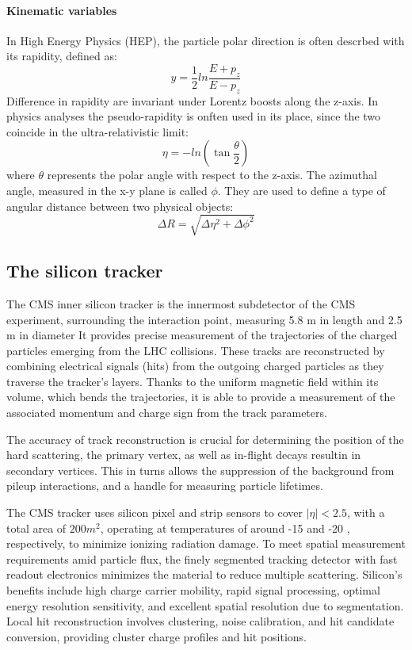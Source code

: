 \paragraph{Kinematic variables\\}
In High Energy Physics (HEP), the particle polar direction is often descrbed with its rapidity, defined as:
\begin{equation}
  \label{eq:rapidityDefinition}
  y = \frac{1}{2} ln \frac{E + p_z}{E - p_z}
\end{equation}
Difference in rapidity are invariant under Lorentz boosts along the z-axis.
In physics analyses the pseudo-rapidity is onften used in its place, since the two coincide in the ultra-relativistic limit:
\begin{equation}
  \label{eq:pseudorapidityDefinition}
  \eta = - ln \left( \tan \frac{\theta}{2} \right)
\end{equation}
where $\theta$ represents the polar angle with respect to the z-axis. The azimuthal angle, measured in the x-y plane is called $\phi$.
They are used to define a type of angular distance between two physical objects:
\begin{equation}
  \label{eq:deltaRDefinition}
  \Delta R = \sqrt{ \Delta \eta^2 + \Delta \phi^2 }
\end{equation}

\subsection{The silicon tracker}
The CMS inner silicon tracker is the innermost subdetector of the CMS experiment, surrounding the interaction point, measuring 5.8 m in length and 2.5 m in diameter
It provides precise measurement of the trajectories of the charged particles emerging from the LHC collisions.
These tracks are reconstructed by combining electrical signals (hits) from the outgoing charged particles as they traverse the tracker's layers.
Thanks to the uniform magnetic field within its volume, which bends the trajectories, it is able to provide a measurement of the associated momentum and charge sign from the track parameters.

The accuracy of track reconstruction is crucial for determining the position of the hard scattering, the primary vertex, as well as in-flight decays resultin in secondary vertices.
This in turns allows the suppression of the background from pileup interactions, and a handle for measuring particle lifetimes.

The CMS tracker uses silicon pixel and strip sensors to cover $|\eta| < 2.5$, with a total area of $200 m^2$,
operating at temperatures of around -15 \Celsius and -20 \Celsius, respectively, to minimize ionizing radiation damage.
To meet spatial measurement requirements amid particle flux, the finely segmented tracking detector with fast readout electronics minimizes the material to reduce multiple scattering.
Silicon's benefits include high charge carrier mobility, rapid signal processing, optimal energy resolution sensitivity, and excellent spatial resolution due to segmentation.
Local hit reconstruction involves clustering, noise calibration, and hit candidate conversion, providing cluster charge profiles and hit positions.

